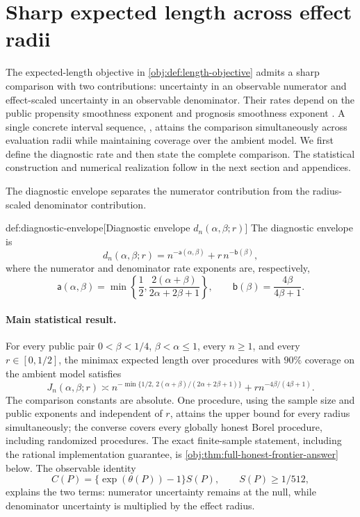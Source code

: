 \documentclass[11pt]{article}
\begin{document}
\section{Sharp expected length across effect radii}

The expected-length objective in \cref{obj:def:length-objective} admits a sharp comparison with two contributions: uncertainty in an observable numerator and effect-scaled uncertainty in an observable denominator. Their rates depend on the public propensity smoothness exponent  and prognosis smoothness exponent . A single concrete interval sequence, , attains the comparison simultaneously across evaluation radii while maintaining coverage over the ambient model. We first define the diagnostic rate and then state the complete comparison. The statistical construction and numerical realization follow in the next section and appendices.

The diagnostic envelope  separates the numerator contribution from the radius-scaled denominator contribution.

\begin{definitionv}{def:diagnostic-envelope}[Diagnostic envelope \(d_n(\alpha,\beta;r)\)]
The diagnostic envelope is
\[
d_n(\alpha,\beta;r)
=
n^{-\mathsf a(\alpha,\beta)}
+r\,n^{-\mathsf b(\beta)},
\]
where the numerator and denominator rate exponents are, respectively,
\[
\mathsf a(\alpha,\beta)
=
\min\left\{\frac12,\frac{2(\alpha+\beta)}{2\alpha+2\beta+1}\right\},
\qquad
\mathsf b(\beta)=\frac{4\beta}{4\beta+1}.
\]
\end{definitionv}

\paragraph{Main statistical result.}
For every public pair \(0<\beta<1/4\), \(\beta<\alpha\le1\), every
\(n\ge1\), and every \(r\in[0,1/2]\), the minimax expected length over
procedures with \(90\%\) coverage on the ambient model satisfies
\[
J_n(\alpha,\beta;r)\asymp
n^{-\min\{1/2,\,2(\alpha+\beta)/(2\alpha+2\beta+1)\}}
+r n^{-4\beta/(4\beta+1)}.
\]
The comparison constants are absolute. One procedure, using the sample size and
public exponents and independent of \(r\), attains the upper bound for every
radius simultaneously; the converse covers every globally honest Borel
procedure, including randomized procedures. The exact finite-sample statement,
including the rational implementation guarantee, is
\cref{obj:thm:full-honest-frontier-answer} below. The observable identity
\[
C(P)=\{\exp(\theta(P))-1\}S(P),\qquad S(P)\ge1/512,
\]
explains the two terms: numerator uncertainty remains at the null, while
denominator uncertainty is multiplied by the effect radius.
\end{document}
